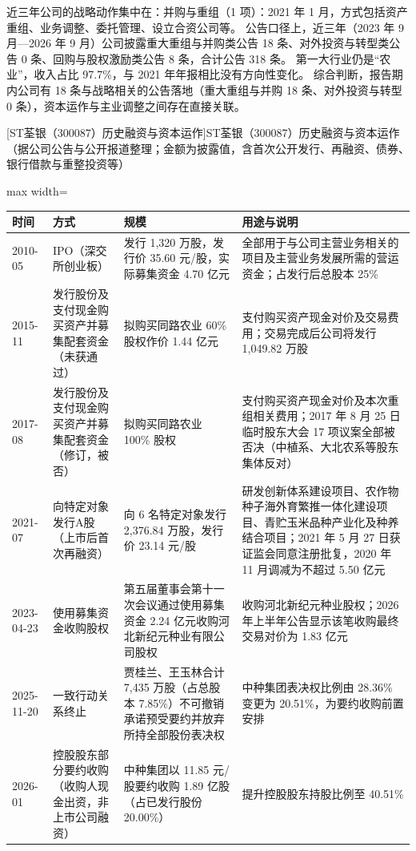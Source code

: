  近三年公司的战略动作集中在：并购与重组（1 项）：2021 年 1 月，方式包括资产重组、业务调整、委托管理、设立合资公司等。 公告口径上，近三年（2023 年 9 月---2026 年 9 月）公司披露重大重组与并购类公告 18 条、对外投资与转型类公告 0 条、回购与股权激励类公告 8 条，合计公告 318 条。 第一大行业仍是“农业”，收入占比 97.7\%，与 2021 年年报相比没有方向性变化。 综合判断，报告期内公司有 18 条与战略相关的公告落地（重大重组与并购 18 条、对外投资与转型 0 条），资本运作与主业调整之间存在直接关联。

\begin{center}\small\setlength{\tabcolsep}{4pt}
[ST荃银（300087）历史融资与资本运作]{ST荃银（300087）历史融资与资本运作（据公司公告与公开报道整理；金额为披露值，含首次公开发行、再融资、债券、银行借款与重整投资等）}
\begin{adjustbox}{max width=\textwidth}
\begin{tabular}{@{}p{1.45cm}p{2.55cm}p{4.05cm}p{4.95cm}@{}}
\toprule
时间 & 方式 & 规模 & 用途与说明 \\
\midrule
2010-05 & IPO（深交所创业板） & 发行 1,\allowbreak{}320 万股，\allowbreak{}发行价 35.60 元/\allowbreak{}股，\allowbreak{}实际募集资金 4.70 亿元 & 全部用于与公司主营业务相关的项目及主营业务发展所需的营运资金；占发行后总股本 25\% \\
2015-11 & 发行股份及支付现金购买资产并募集配套资金（未获通过） & 拟购买同路农业 60\% 股权作价 1.44 亿元 & 支付购买资产现金对价及交易费用；交易完成后公司将发行 1,\allowbreak{}049.82 万股 \\
2017-08 & 发行股份及支付现金购买资产并募集配套资金（修订，被否） & 拟购买同路农业 100\% 股权 & 支付购买资产现金对价及本次重组相关费用；2017 年 8 月 25 日临时股东大会 17 项议案全部被否决（中植系、\allowbreak{}大北农系等股东集体反对） \\
2021-07 & 向特定对象发行A股（上市后首次再融资） & 向 6 名特定对象发行 2,\allowbreak{}376.84 万股，\allowbreak{}发行价 23.14 元/\allowbreak{}股 & 研发创新体系建设项目、\allowbreak{}农作物种子海外育繁推一体化建设项目、\allowbreak{}青贮玉米品种产业化及种养结合项目；2021 年 5 月 27 日获证监会同意注册批复，\allowbreak{}2020 年 11 月调减为不超过 5.50 亿元 \\
2023-04-23 & 使用募集资金收购股权 & 第五届董事会第十一次会议通过使用募集资金 2.24 亿元收购河北新纪元种业有限公司股权 & 收购河北新纪元种业股权；2026 年上半年公告显示该笔收购最终交易对价为 1.83 亿元 \\
2025-11-20 & 一致行动关系终止 & 贾桂兰、\allowbreak{}王玉林合计 7,\allowbreak{}435 万股（占总股本 7.85\%）不可撤销承诺预受要约并放弃所持全部股份表决权 & 中种集团表决权比例由 28.36\% 变更为 20.51\%，\allowbreak{}为要约收购前置安排 \\
2026-01 & 控股股东部分要约收购（收购人现金出资，非上市公司融资） & 中种集团以 11.85 元/\allowbreak{}股要约收购 1.89 亿股（占已发行股份 20.00\%） & 提升控股股东持股比例至 40.51\% \\
\bottomrule
\end{tabular}
\end{adjustbox}
\end{center}

